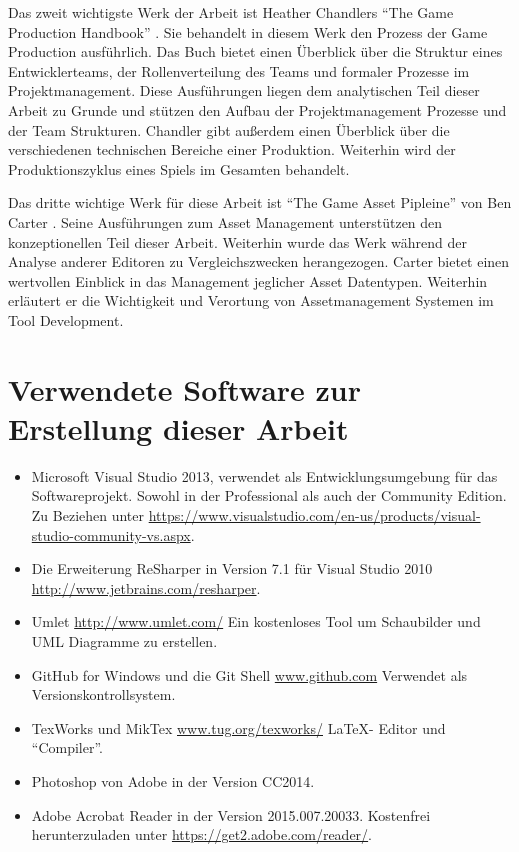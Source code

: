 \documentclass[pagesize, paper=a4, fontsize=12pt, titlepage=true, headings=small, headnosepline, abstractoff, liststotoc, nochapterprefix, plainheadsepline, twoside]{scrreprt}
\begin{document}
Das zweit wichtigste Werk der Arbeit ist Heather Chandlers “The Game Production Handbook” \parencite{Chandler2006}. Sie behandelt in diesem Werk den Prozess der Game Production ausführlich. Das Buch bietet einen Überblick über die Struktur eines Entwicklerteams, der Rollenverteilung des Teams und formaler Prozesse im Projektmanagement. Diese Ausführungen liegen dem analytischen Teil dieser Arbeit zu Grunde und stützen den Aufbau der Projektmanagement Prozesse und der Team Strukturen. Chandler gibt außerdem einen Überblick über die verschiedenen technischen Bereiche einer Produktion. Weiterhin wird der Produktionszyklus eines Spiels im Gesamten behandelt.

Das dritte wichtige Werk für diese Arbeit ist “The Game Asset Pipleine” von Ben Carter \parencite{Carter2004}. Seine Ausführungen zum Asset Management unterstützen den konzeptionellen Teil dieser Arbeit. Weiterhin wurde das Werk während der Analyse anderer Editoren zu Vergleichszwecken herangezogen. Carter bietet einen wertvollen Einblick in das Management jeglicher Asset Datentypen. Weiterhin erläutert er die Wichtigkeit und Verortung von Assetmanagement Systemen im Tool Development.

\section{Verwendete Software zur Erstellung dieser Arbeit}
\begin{itemize}
\item Microsoft Visual Studio 2013, \newline verwendet als Entwicklungsumgebung für das Softwareprojekt. Sowohl in der Professional als auch der Community Edition. Zu Beziehen unter  \url{https://www.visualstudio.com/en-us/products/visual-studio-community-vs.aspx}.
\item Die Erweiterung ReSharper in Version 7.1 für Visual Studio 2010 \url{http://www.jetbrains.com/resharper}.
\item Umlet \url{http://www.umlet.com/} \newline Ein kostenloses Tool um Schaubilder und UML Diagramme zu erstellen.
\item GitHub for Windows und die Git Shell \url{www.github.com} \newline Verwendet als Versionskontrollsystem.
\item TexWorks und MikTex \url{www.tug.org/texworks/} \newline \LaTeX- Editor und “Compiler”.
\item Photoshop von Adobe in der Version CC2014.
\item Adobe Acrobat Reader in der Version 2015.007.20033. Kostenfrei herunterzuladen unter \url{https://get2.adobe.com/reader/}.
\end{itemize}
\end{document}
